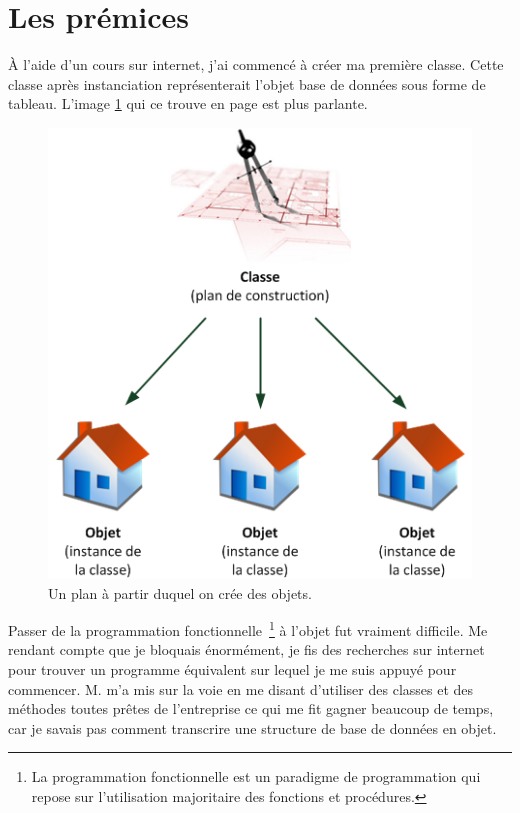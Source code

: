 \section{Les prémices} %
\label{sec:Les prémices}

À l'aide d'un cours sur internet, j'ai commencé à créer ma première classe.
Cette classe après instanciation représenterait l'objet \og base de données
\fg{} sous forme de tableau. L'image \ref{obj} qui ce trouve en page
\pageref{obj} est plus parlante.

\begin{figure}
\begin{center}
\includegraphics[scale=0.5]{images/objet.png}
\end{center}
\caption{Un plan à partir duquel on crée des objets.}
\label{obj}
\end{figure}

Passer de la programmation fonctionnelle\, \footnote{La programmation
fonctionnelle est un paradigme de programmation qui repose sur l'utilisation
majoritaire des fonctions et procédures.} à l'objet fut vraiment difficile. Me
rendant compte que je bloquais énormément, je fis des recherches sur internet
pour trouver un programme équivalent sur lequel je me suis appuyé pour
commencer. M. m'a mis sur la voie en me disant d'utiliser des
classes et des méthodes toutes prêtes de l'entreprise ce qui me fit gagner
beaucoup de temps, car je savais pas comment transcrire une structure de base
de données en objet.

